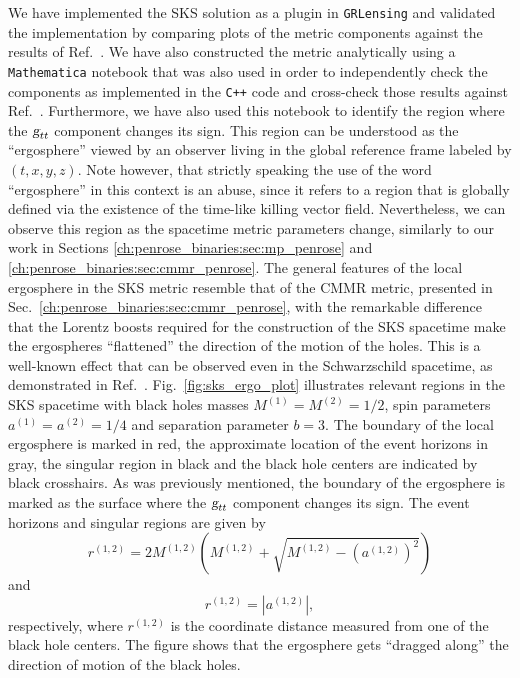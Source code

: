 We have implemented the SKS solution as a plugin in \texttt{GRLensing} and validated the implementation by comparing plots of the metric components against the results of Ref.~\cite{PhysRevD.104.044041}. We have also constructed the metric analytically using a \texttt{Mathematica} notebook that was also used in order to independently check the components as implemented in the \texttt{C++} code and cross-check those results against Ref.~\cite{PhysRevD.104.044041}. Furthermore, we have also used this notebook to identify the region where the $\mtrtens{t}{t}$ component changes its sign. This region can be understood as the ``ergosphere'' viewed by an observer living in the global reference frame labeled by $(t,x,y,z)$. Note however, that strictly speaking the use of the word ``ergosphere'' in this context is an abuse, since it refers to a region that is globally defined via the existence of the time-like killing vector field. Nevertheless, we can observe this region as the spacetime metric parameters change, similarly to our work in Sections \ref{ch:penrose_binaries:sec:mp_penrose} and \ref{ch:penrose_binaries:sec:cmmr_penrose}. The general features of the local ergosphere in the SKS metric resemble that of the CMMR metric, presented in Sec.~\ref{ch:penrose_binaries:sec:cmmr_penrose}, with the remarkable difference that the Lorentz boosts required for the construction of the SKS spacetime make the ergospheres ``flattened'' the direction of the motion of the holes. This is a well-known effect that can be observed even in the Schwarzschild spacetime, as demonstrated in Ref.~\cite{PhysRevD.91.084044}. Fig.~\ref{fig:sks_ergo_plot} illustrates relevant regions in the SKS spacetime with black holes masses $M^{(1)} = M^{(2)} = 1/2$, spin parameters $a^{(1)} = a^{(2)} = 1/4$ and separation parameter $b = 3$. The boundary of the local ergosphere is marked in red, the approximate location of the event horizons in gray, the singular region in black and the black hole centers are indicated by black crosshairs. As was previously mentioned, the boundary of the ergosphere is marked as the surface where the $\mtrtens{t}{t}$ component changes its sign. The event horizons and singular regions are given by~\cite{Armengol:2021shd}
%
\begin{equation}
  r^{(1,2)} = 2 M^{(1,2)} \left( M^{(1,2)} + \sqrt{M^{(1,2)} - \left(a^{(1,2)}\right)^2} \right)
  \label{eq:arbitrary_penrose_sks_keplerian_approx_horizons}
\end{equation}
%
and
%
\begin{equation}
  r^{(1,2)} = \left| a^{(1,2)} \right|,
  \label{eq:arbitrary_penrose_sks_keplerian_approx_singularities}
\end{equation}
%
respectively, where $r^{(1,2)}$ is the coordinate distance measured from one of the black hole centers. The figure shows that the ergosphere gets ``dragged along'' the direction of motion of the black holes.

